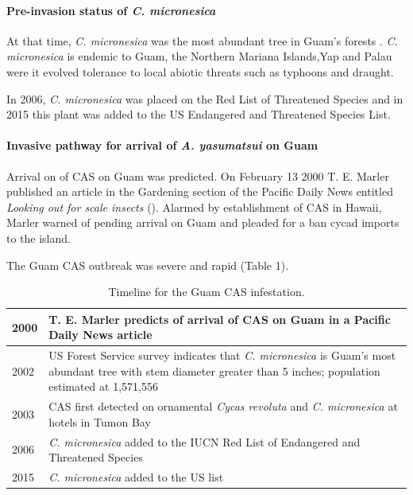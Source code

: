 \documentclass[12pt,letterpaper,english,bibliography=totocnumbered, abstract=on]{scrartcl}
\begin{document}
\paragraph{Pre-invasion status of \textit{C. micronesica}}

At that time, \textit{C. micronesica} was the most abundant tree in Guam's forests \cite{donnegon_guams_2004}. \textit{C. micronesica} is endemic to Guam, the Northern Mariana Islands,Yap and Palau were it evolved tolerance to local abiotic threats such as typhoons and draught. 

In 2006, \textit{C. micronesica} was placed on the Red List of Threatened Species and in 2015 this plant was added to the US Endangered and Threatened Species List.

\paragraph{Invasive pathway for arrival of \textit{A. yasumatsui} on Guam} 

Arrival on of CAS on Guam was predicted. On February 13 2000 T. E. Marler published an article in the Gardening section of the Pacific Daily News entitled \textit{Looking out for scale insects} (\cite{haynesExoticInvasivePest2005}). Alarmed by establishment of CAS in Hawaii, Marler warned of pending arrival on Guam and pleaded for a ban cycad imports to the island. 

The Guam CAS outbreak was severe and rapid (Table 1).

\begin{table}[H]
	\centering
	\label{tab:timeline}	
	\caption{Timeline for the Guam CAS infestation.}	
	\begin{tabular}{l>{\raggedright\arraybackslash}p{4.5in}}
		\hline
		2000 & T. E. Marler predicts of arrival of CAS on Guam in a Pacific Daily News article \parencite{haynesExoticInvasivePest2005}\\
		\hline
		2002 & US Forest Service survey indicates that \textit{C. micronesica} is Guam's most abundant tree with stem diameter greater than 5 inches; population estimated at 1,571,556 \parencite{donnegon_guams_2004}\\
		\hline
		2003 & CAS first detected on ornamental \textit{Cycas revoluta} and \textit{C. micronesica} at hotels in Tumon Bay  \\
		\hline
		2006 & \textit{C. micronesica} added to the IUCN Red List of Endangered and Threatened Species\\
		\hline
		2015 & \textit{C. micronesica} added to the US list\\
		\hline
	\end{tabular}	
\end{table}
\end{document}
